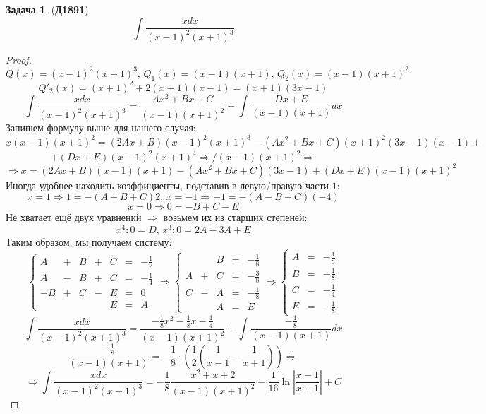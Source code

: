 \documentclass[12pt]{article}
\theoremstyle{definition}
\newtheorem{problem}{Задача}
\DeclareMathOperator{\dint}{\displaystyle\int}
\begin{document}
\begin{problem}(\textbf{Д1891})
	$$
		\dint \dfrac{xdx}{(x-1)^2(x + 1)^3}
	$$
\end{problem}
\begin{proof}
	$$
		Q(x) = (x-1)^2(x+1)^3, \, Q_1(x) = (x-1)(x + 1), \, Q_2(x) = (x-1)(x+1)^2
	$$
	$$
		Q'_2(x) = (x+1)^2 + 2(x+1)(x - 1) = (x + 1)(3x -1 )
	$$
	$$
		\dint \dfrac{xdx}{(x-1)^2(x + 1)^3} = \dfrac{Ax^2 + Bx + C}{(x-1)(x+1)^2} + \dint \dfrac{Dx + E}{(x-1)(x+1)}dx
	$$
	Запишем формулу выше для нашего случая:
	$$
		x(x-1)(x+1)^2 = (2Ax + B)(x-1)^2(x+1)^3 - (Ax^2 + Bx + C)(x+1)^2(3x-1)(x-1) +
	$$
	$$
		+ (Dx + E)(x-1)^2(x+1)^4 \Rightarrow /(x-1)(x+1)^2 \Rightarrow
	$$
	$$	
		\Rightarrow x = (2Ax + B)(x-1)(x+1) - (Ax^2 + Bx + C)(3x -1) + (Dx + E)(x-1)(x+1)^2
	$$
	Иногда удобнее находить коэффициенты, подставив в левую/правую части $1$:
	$$
		x = 1 \Rightarrow 1 = -(A +B +C)2, \, x = -1 \Rightarrow -1 = -(A - B + C)(-4)
	$$
	$$
		x = 0 \Rightarrow 0 = -B +C -E
	$$
	Не хватает ещё двух уравнений $\Rightarrow$ возьмем их из старших степеней:
	$$
		x^4 \colon 0= D, \, x^3 \colon 0 = 2A -3A +E
	$$
	Таким образом, мы получаем систему:
	$$
		\left\{
			\begin{matrix}
				A &+& B &+& C &=& -\tfrac{1}{2}\\[5pt]
				A &-& B &+& C &=& -\tfrac{1}{4}\\[5pt]
				-B &+& C &-& E &=& 0\\[5pt]
				&&&&E &=& A
			\end{matrix}
		\right. \Rightarrow
		\left\{
			\begin{matrix}
				&&B & = & -\tfrac{1}{8}\\[5pt]
				A &+& C &=& -\tfrac{3}{8}\\[5pt]
				C &-& A &=& -\tfrac{1}{8}\\[5pt]
				&&A &=& E
			\end{matrix}
		\right. \Rightarrow
		\left\{
			\begin{matrix}
				A & = & -\tfrac{1}{8}\\[5pt]
				B &=& -\tfrac{1}{8}\\[5pt]
				C &=& -\tfrac{1}{4}\\[5pt]
				E &=& -\tfrac{1}{8}
			\end{matrix}
		\right.
	$$
	$$
		\dint \dfrac{xdx}{(x-1)^2(x + 1)^3} = \dfrac{-\frac{1}{8}x^2  - \frac{1}{8}x - \frac{1}{4}}{(x-1)(x+1)^2} + \dint \dfrac{-\frac{1}{8}}{(x-1)(x+1)}dx
	$$
	$$
		\dfrac{-\frac{1}{8}}{(x-1)(x+1)} = -\dfrac{1}{8}{\cdot}\left(\dfrac{1}{2}\left(\dfrac{1}{x-1} - \dfrac{1}{x+1}\right)\right) \Rightarrow
	$$
	$$
		\Rightarrow \dint \dfrac{xdx}{(x-1)^2(x + 1)^3} = -\dfrac{1}{8}\dfrac{x^2  + x + 2}{(x-1)(x+1)^2} - \dfrac{1}{16} \ln{\left|\dfrac{x-1}{x + 1}\right|} +C
	$$
\end{proof}
\end{document}
